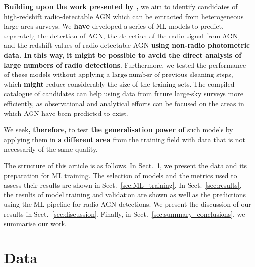 \documentclass{aa}
\begin{document}
\textbf{Building upon the work presented by \citet{2021Galax...9...86C},} we aim to identify candidates of high-redshift radio-detectable AGN which can be extracted from heterogeneous large-area surveys. We \textbf{have} developed a series of ML models to predict, separately, the detection of AGN, the detection of the radio signal from AGN, and the redshift values of radio-detectable AGN \textbf{using non-radio photometric data. In this way, it might be possible to avoid the direct analysis of large numbers of radio detections}. Furthermore, we tested the performance of these models without applying a large number of previous cleaning steps, which \textbf{might} reduce considerably the size of the training sets. The compiled catalogue of candidates can help using data from future large-sky surveys more efficiently, as observational and analytical efforts can be focused on the areas in which AGN have been predicted to exist.

We seek\textbf{, therefore,} to test \textbf{the generalisation power of} such models by applying them in \textbf{a different area} from the training field with data that is not necessarily of the same quality. %

The structure of this article is as follows. In Sect.~\ref{sec:data}, we present the data and its preparation for ML training. The selection of models and the metrics used to assess their results are shown in Sect.~\ref{sec:ML_training}. In Sect.~\ref{sec:results}, the results of model training and validation are shown as well as the predictions using the ML pipeline for radio AGN detections. We present the discussion of our results in Sect.~\ref{sec:discussion}. Finally, in Sect.~\ref{sec:summary_conclusions}, we summarise our work.

\section{Data}\label{sec:data}
\end{document}
